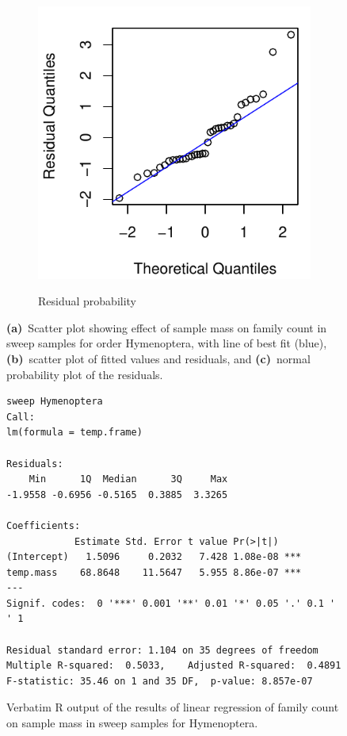 \documentclass[10pt,letterpaper,twocolumn]{article}
\begin{document}
\begin{figure}[h]
\begin{subfigure}[b]{0.15\textwidth}
		\label{fig:sweep_hymenoptera_resid}
	\end{subfigure}
	~
	\begin{subfigure}[b]{0.15\textwidth}
		\caption{Residual probability}
		\includegraphics[width=\textwidth]{plots/mass-vs-count/qqplot/2015_sweep_Hymenoptera_qqplot.pdf}
		\label{fig:sweep_hymenoptera_qqplot}
	\end{subfigure}
	\caption{\textbf{(a)}~Scatter plot showing effect of sample mass on family count in sweep samples for order Hymenoptera, with line of best fit (blue), \textbf{(b)}~scatter plot of fitted values and residuals, and \textbf{(c)}~normal probability plot of the residuals.}
	\label{fig:sweep_hymenoptera}
	\smallskip
	\nointerlineskip
	\hrulefill
\end{figure}

\begin{figure}[h]
	\lstset{numbers=left}
	\lstset{xleftmargin=5mm,framexleftmargin=5mm}
	\begin{lstlisting}
sweep Hymenoptera
Call:
lm(formula = temp.frame)

Residuals:
    Min      1Q  Median      3Q     Max 
-1.9558 -0.6956 -0.5165  0.3885  3.3265 

Coefficients:
            Estimate Std. Error t value Pr(>|t|)    
(Intercept)   1.5096     0.2032   7.428 1.08e-08 ***
temp.mass    68.8648    11.5647   5.955 8.86e-07 ***
---
Signif. codes:  0 '***' 0.001 '**' 0.01 '*' 0.05 '.' 0.1 ' ' 1

Residual standard error: 1.104 on 35 degrees of freedom
Multiple R-squared:  0.5033,	Adjusted R-squared:  0.4891 
F-statistic: 35.46 on 1 and 35 DF,  p-value: 8.857e-07
	\end{lstlisting}
	\caption{Verbatim R output of the results of linear regression of family count on sample mass in sweep samples for Hymenoptera.}
	\label{fig:sweep_hymenoptera_regression}
	\smallskip
	\nointerlineskip
	\hrulefill
\end{figure}
\end{document}
